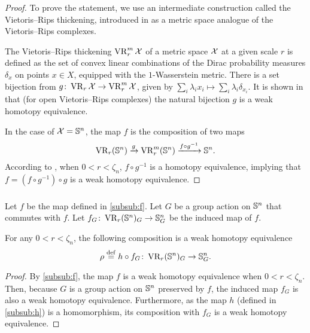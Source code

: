\begin{proof}
	To prove the statement, we use an intermediate construction called the Vietoris--Rips thickening, introduced in \cite{adamaszek2018metric} as a metric space analogue of the Vietoris--Rips complexes.

	The Vietoris--Rips thickening $\operatorname{VR}_r^m\mathcal{X}$ of a metric space $\mathcal{X}$ at a given scale $r$ is defined as the set of convex linear combinations of the Dirac probability measures $\delta_{x}$ on points $x \in X$, equipped with the $1$-Wasserstein metric.
	There is a set bijection from $g \colon \operatorname{VR}_r\mathcal{X} \to \operatorname{VR}_r^m\mathcal{X}$, given by $\sum_i \lambda_i x_i \mapsto \sum_i \lambda_i \delta_{x_i}.$
	It is shown in \cite[Theorem 1]{gillespie2024vietoris} that (for open Vietoris--Rips complexes) the natural bijection $g$ is a weak homotopy equivalence.

	In the case of $\mathcal{X} = \mathbb{S}^n$, the map $f$ is the composition of two maps
	\[
	\operatorname{VR}_r(\mathbb{S}^n) \xrightarrow{g} \operatorname{VR}_r^m(\mathbb{S}^n) \xrightarrow{f \circ g^{-1}} \mathbb{S}^n.
	\]
	According to \cite[Proposition 5.3]{adamaszek2018metric}, when $0<r<\zeta_n$, $f \circ g^{-1}$ is a homotopy equivalence, implying that $f = (f \circ g^{-1}) \circ g$ is a weak homotopy equivalence.
\end{proof}

\subsubsection{}
\label{subsub:rho}
Let $f$ be the map defined in \cref{subsub:f}.
Let $G$ be a group action on $\mathbb{S}^n$ that commutes with $f$.
Let $f_G \colon \operatorname{VR}_r(\mathbb{S}^n)_G \to \mathbb{S}^n_G$ be the induced map of $f$.

\medskip\lemma
For any $0 < r < \zeta_n$, the following composition is a weak homotopy equivalence
\[
\rho \stackrel{\mathrm{def}}{=} h \circ f_G
\colon \operatorname{VR}_r(\mathbb{S}^n)_G \to \mathbb{S}^n_G.
\]
\begin{proof}
	By \cref{subsub:f}, the map $f$ is a weak homotopy equivalence when $0<r<\zeta_n$.
	Then, because $G$ is a group action on $\mathbb{S}^n$ preserved by $f$, the induced map $f_G$ is also a weak homotopy equivalence.
	Furthermore, as the map $h$ (defined in \cref{subsub:h}) is a homomorphism, its composition with $f_G$ is a weak homotopy equivalence.
\end{proof}

